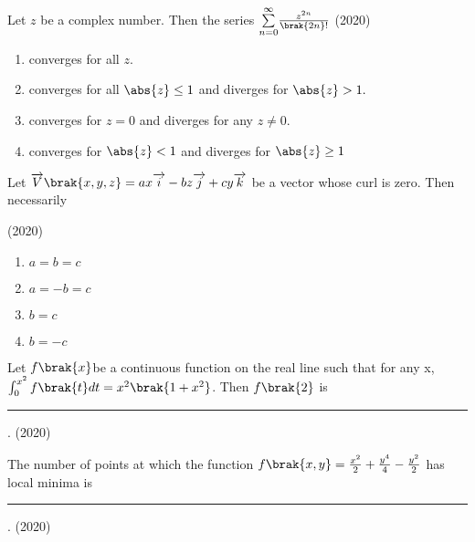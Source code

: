 \iffalse
	\chapter{2020}
	\author{AI24BTECH11003}
	\section{xe}
\fi

    \item Let $z$ be a complex number. Then the series $\underset{n=0}{\overset{\infty}{\sum}}\frac{z^{2n}}{\brak{2n}!}$ 
    \hfill{(2020)}
    

        \begin{enumerate}
            \item converges for all $z.$
            \item converges for all $\abs{z}\leq1$ and diverges for $\abs{z}>1.$
            \item converges for $z=0$ and diverges for any $z\neq0.$
            \item converges for $\abs{z}<1$ and diverges for $\abs{z}\geq1$
        \end{enumerate}


    \item Let $\overrightarrow{V}\brak{x,y,z} = ax\overrightarrow{i}-bz\overrightarrow{j} +cy\overrightarrow{k}$ be a vector whose curl is zero. Then necessarily
    
    \hfill{(2020)}

        \begin{multicols}{4}
        \begin{enumerate}
            \item $a=b=c$
            \item $a=-b=c$
            \item $b=c$
            \item $b=-c$
        \end{enumerate}
    \end{multicols}

    \item Let $f\brak{x}$be a continuous function on the real line such that for any x, $\int_0^{x^2}f\brak{t}dt=x^2\brak{1+x^2}$. Then $f\brak{2}$ is \rule{1cm}{0.15mm}.
    \hfill{(2020)}


    \item The number of points at which the function $f\brak{x,y} = \frac{x^2}{2}+\frac{y^4}{4}-\frac{y^2}{2}$ has local minima is \rule{1cm}{0.15mm}.
    \hfill{(2020)}
    

